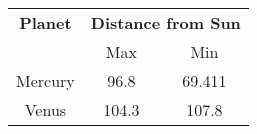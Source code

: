 \documentclass{article}
\begin{document}
\begin{tabular}{|c|c|c|}
\hline
\textbf{Planet} & \multicolumn{2}{c|}{\textbf{Distance from Sun}} \\
\cline{2-3}
& Max & Min \\
\hline
Mercury & 96.8 & 69.411 \\
Venus & 104.3 & 107.8 \\
\hline
\end{tabular}
\end{document}
